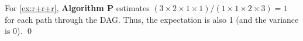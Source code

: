 \begin{tcolorbox}[
    colback=SkyBlue!5,
    colframe=blue!20,
    boxrule=1pt,
    arc=2pt,
    width=\textwidth,
    breakable
]
\begin{example}
For \cref{ex:r+r+r}, \textbf{Algorithm P} estimates $(3\times 2\times 1 \times 1)/(1\times 1 \times 2\times 3) = 1$ for each path through the DAG.
Thus, the expectation is also 1 (and the variance is 0).
\qed
\end{example}
\end{tcolorbox}